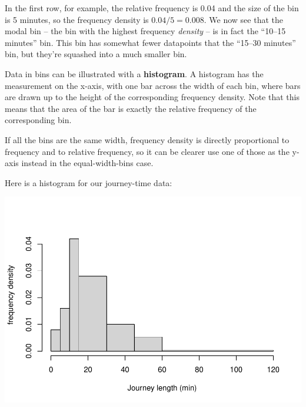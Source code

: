 \documentclass[
  a4paper,
]{book}
\newenvironment{Shaded}{\begin{snugshade}}{\end{snugshade}}
\newcommand{\AttributeTok}[1]{\textcolor[rgb]{0.77,0.63,0.00}{#1}}
\newcommand{\DecValTok}[1]{\textcolor[rgb]{0.00,0.00,0.81}{#1}}
\newcommand{\FunctionTok}[1]{\textcolor[rgb]{0.00,0.00,0.00}{#1}}
\newcommand{\NormalTok}[1]{#1}
\newcommand{\OtherTok}[1]{\textcolor[rgb]{0.56,0.35,0.01}{#1}}
\newcommand{\SpecialCharTok}[1]{\textcolor[rgb]{0.00,0.00,0.00}{#1}}
\newcommand{\StringTok}[1]{\textcolor[rgb]{0.31,0.60,0.02}{#1}}
\theoremstyle{definition}
\theoremstyle{definition}
\theoremstyle{definition}
\theoremstyle{definition}
\theoremstyle{remark}
\begin{document}
In the first row, for example, the relative frequency is 0.04 and the size of the bin is 5 minutes, so the frequency density is \(0.04/5 = 0.008\). We now see that the modal bin -- the bin with the highest frequency \emph{density} -- is in fact the ``10--15 minutes'' bin. This bin has somewhat fewer datapoints that the ``15--30 minutes'' bin, but they're squashed into a much smaller bin.

Data in bins can be illustrated with a \textbf{histogram}. A histogram has the measurement on the x-axis, with one bar across the width of each bin, where bars are drawn up to the height of the corresponding frequency density. Note that this means that the area of the bar is exactly the relative frequency of the corresponding bin.

If all the bins are the same width, frequency density is directly proportional to frequency and to relative frequency, so it can be clearer use one of those as the y-axis instead in the equal-width-bins case.

Here is a histogram for our journey-time data:

\begin{Shaded}
\end{Shaded}

\includegraphics{math1710_files/figure-latex/journeys-1.pdf}
\end{document}
